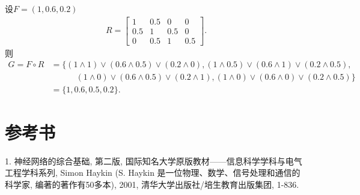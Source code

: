 \begin{example}
设$F=(1, 0.6, 0.2)$
\begin{align}
  R=\left[
  \begin{array}{cccc}
  {1} & {0.5} & {0} & {0} \\
  {0.5} & {1} & {0.5} & {0} \\
  {0} & {0.5} & {1} & {0.5}
  \end{array}
  \right].
\end{align}
则
\begin{align*}
  G=F\circ R&=\{(1\wedge 1)\vee (0.6\wedge 0.5)\vee (0.2\wedge 0), (1\wedge 0.5)\vee (0.6\wedge 1)\vee (0.2\wedge 0.5),\\
            &\qquad\quad  (1\wedge 0)\vee (0.6\wedge 0.5)\vee (0.2\wedge 1), (1\wedge 0)\vee (0.6\wedge 0)\vee (0.2\wedge 0.5)\}\\
            & =\{1, 0.6, 0.5, 0.2\}.
\end{align*}
\vspace{-0.55cm}
\end{example}
\section{参考书}

1. 神经网络的综合基础, 第二版,  国际知名大学原版教材——信息科学学科与电气工程学科系列,
Simon Haykin (S. Haykin 是一位物理、数学、信号处理和通信的科学家, 编著的著作有50多本), 2001, 清华大学出版社/培生教育出版集团, 1-836.
